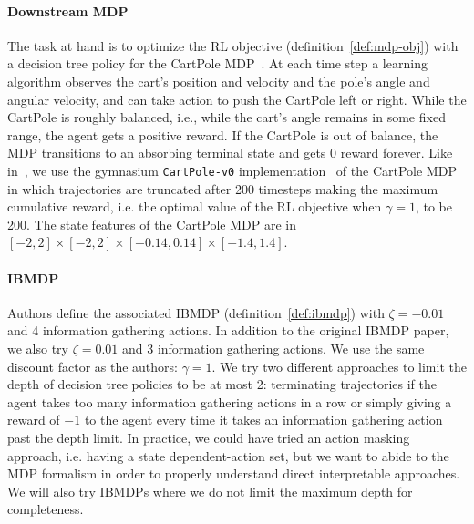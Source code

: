 \paragraph{Downstream MDP} The task at hand is to optimize the RL objective (definition~\ref{def:mdp-obj}) with a decision tree policy for the CartPole MDP~\citep{cartpole}.
At each time step a learning algorithm observes the cart's position and velocity and the pole's angle and angular velocity, and can take action to push the CartPole left or right.
While the CartPole is roughly balanced, i.e., while the cart's angle remains in some fixed range, the agent gets a positive reward.
If the CartPole is out of balance, the MDP transitions to an absorbing terminal state and gets 0 reward forever.
Like in~\citep{topin2021iterative}, we use the gymnasium \texttt{CartPole-v0} implementation~\citep{gymnasium} of the CartPole MDP in which trajectories are truncated after 200 timesteps making the maximum cumulative reward, i.e. the optimal value of the RL objective when $\gamma=1$, to be 200.
The state features of the CartPole MDP are in $[-2, 2] \times [-2, 2] \times [-0.14, 0.14] \times [-1.4, 1.4]$.

\paragraph{IBMDP} Authors define the associated IBMDP (definition~\ref{def:ibmdp}) with $\zeta=-0.01$ and 4 information gathering actions.
In addition to the original IBMDP paper, we also try $\zeta=0.01$ and 3 information gathering actions.
We use the same discount factor as the authors: $\gamma=1$.
We try two different approaches to limit the depth of decision tree policies to be at most 2: terminating trajectories if the agent takes too many information gathering actions in a row or simply giving a reward of $-1$ to the agent every time it takes an information gathering action past the depth limit.
In practice, we could have tried an action masking approach, i.e. having a state dependent-action set, but we want to abide to the MDP formalism in order to properly understand direct interpretable approaches.
We will also try IBMDPs where we do not limit the maximum depth for completeness.

